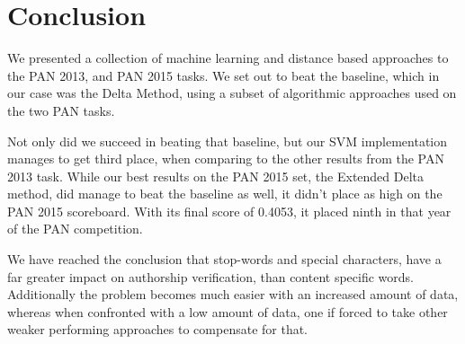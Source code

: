\section{Conclusion} \label{sec:conclusion} 

We presented a collection of machine learning and distance based approaches
to the PAN 2013, and PAN 2015 tasks. We set out to beat the baseline, 
which in our case was the Delta Method, using a subset of algorithmic
approaches used on the two PAN tasks. 

Not only did we succeed in beating that baseline, but our SVM implementation
manages to get third place, when comparing to the other results from the PAN
2013 task. While our best results on the PAN 2015 set, the Extended Delta
method, did manage to beat the baseline as well, it didn't place as high on the
PAN 2015 scoreboard. With its final score of 0.4053, it placed ninth in that
year of the PAN competition.

We have reached the conclusion that stop-words and special characters, have a
far greater impact on authorship verification, than content specific words.
Additionally the problem becomes much easier with an increased amount of data,
whereas when confronted with a low amount of data, one if forced to take other
weaker performing approaches to compensate for that.

